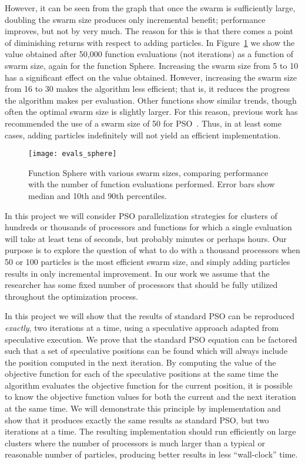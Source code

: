 \documentclass[ms]{byuprop}
\newcommand{\figref}[1]{Figure~\ref{fig:#1}}
\begin{document}
However, it can be seen from the graph that once the swarm is sufficiently
large, doubling the swarm size produces only incremental benefit; performance
improves, but not by very much.  The reason for this is that there comes a
point of diminishing returns with respect to adding particles.  In
\figref{evals-sphere} we show the value obtained after 50,000 function
evaluations (not iterations) as a function of swarm size, again for the
function Sphere.  Increasing the swarm size from 5 to 10 has a significant
effect on the value obtained.  However, increasing the swarm size from 16 to 30
makes the algorithm less efficient; that is, it reduces the progress the
algorithm makes per evaluation.  Other functions show similar trends, though
often the optimal swarm size is slightly larger.  For this reason, previous
work has recommended the use of a swarm size of 50 for
PSO~\citep{bratton-2007-defining-a-standard-for-pso}.  Thus, in at least some
cases, adding particles indefinitely will not yield an efficient
implementation.

\begin{figure}
  \centering
  \texttt{[image: evals\_sphere]}
  \caption{Function Sphere with various swarm sizes, comparing performance with
  the number of function evaluations performed.  Error bars show median and
  10th and 90th percentiles.}
  \label{fig:evals-sphere}
\end{figure}

In this project we will consider PSO parallelization strategies for clusters of
hundreds or thousands of processors and functions for which a single evaluation
will take at least tens of seconds, but probably minutes or perhaps hours.  Our
purpose is to explore the question of what to do with a thousand processors
when 50 or 100 particles is the most efficient swarm size, and simply adding
particles results in only incremental improvement.  In our work we assume that
the researcher has some fixed number of processors that should be fully
utilized throughout the optimization process.

In this project we will show that the results of standard PSO can be reproduced
\emph{exactly}, two iterations at a time, using a speculative approach adapted
from speculative execution. We prove that the standard PSO equation can be
factored such that a set of speculative positions can be found which will
always include the position computed in the next iteration.  By computing the
value of the objective function for each of the speculative positions at the
same time the algorithm evaluates the objective function for the current
position, it is possible to know the objective function values for both the
current and the next iteration at the same time.  We will demonstrate this
principle by implementation and show that it produces exactly the same results
as standard PSO, but two iterations at a time.  The resulting implementation
should run efficiently on large clusters where the number of processors is much
larger than a typical or reasonable number of particles, producing better
results in less ``wall-clock'' time.
\end{document}
